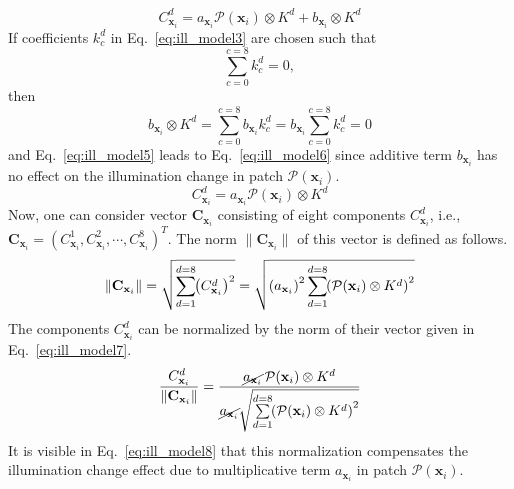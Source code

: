\documentclass[a4paper,fleqn]{cas-dc}
\begin{document}
%
\begin{equation} \label{eq:ill_model5}
C_{\mathbf{x}_i}^d = a_{\mathbf{x}_i}\mathcal{P}({\mathbf{x}_i}) \otimes K^d + b_{\mathbf{x}_i} \otimes K^d
\end{equation}
%
If coefficients $k_c^d$ in Eq.~\eqref{eq:ill_model3} are chosen such that 
\begin{equation} 
\sum_{c=0}^{c=8} k_{c}^d = 0,  \nonumber
\end{equation}
%
then 
%
\begin{equation} 
b_{\mathbf{x}_i} \otimes K^d =  \sum_{c=0}^{c=8} b_{\mathbf{x}_i}k_{c}^d = 
b_{\mathbf{x}_i} \sum_{c=0}^{c=8} k_{c}^d = 0
\nonumber 
\end{equation}
%
and Eq.~\eqref{eq:ill_model5} leads to Eq.~\eqref{eq:ill_model6} since additive term $b_{\mathbf{x}_i}$ has no effect on the illumination change in patch $\mathcal{P}({\mathbf{x}_i})$.  
%
\begin{equation} \label{eq:ill_model6}
C_{\mathbf{x}_i}^d = a_{\mathbf{x}_i}\mathcal{P}({\mathbf{x}_i}) \otimes K^d 
\end{equation}
Now, one can consider vector $\mathbf{C}_{\mathbf{x}_i}$ consisting of eight components $C_{\mathbf{x}_i}^d$, i.e., $\mathbf{C}_{\mathbf{x}_i} = \left(C_{\mathbf{x}_i}^1, C_{\mathbf{x}_i}^2, \cdots, C_{\mathbf{x}_i}^8\right)^T$. The norm $\|\mathbf{C}_{\mathbf{x}_i}\|$ of this vector is defined as follows.
%
\begin{equation} \label{eq:ill_model7}
\|\mathbf{C}_{\mathbf{x}_i}\| = \sqrt{\sum_{d=1}^{d=8}\hspace*{-1mm}\left(C_{\mathbf{x}_i}^d\right)^2} = \sqrt{\left(a_{\mathbf{x}_i}\right)^2\sum_{d=1}^{d=8} \hspace*{-1mm} \left(\mathcal{P}({\mathbf{x}_i}) \otimes K^d \right)^2}
\end{equation}
%
The components $C_{\mathbf{x}_i}^d$ can be normalized by the norm of their vector given in Eq.~\eqref{eq:ill_model7}.  
%
\begin{equation} \label{eq:ill_model8}
\frac{C_{\mathbf{x}_i}^d}{\|\mathbf{C}_{\mathbf{x}_i}\|} = 
\frac{\cancel{a_{\mathbf{x}_i}}\,\mathcal{P}({\mathbf{x}_i}) \otimes K^d}
{\cancel{a_{\mathbf{x}_i}}\sqrt{\sum\limits_{d=1}^{d=8} \hspace*{-1mm} \left(\mathcal{P}({\mathbf{x}_i}) \otimes K^d \right)^2}} 
\end{equation}
%
It is visible in Eq.~\eqref{eq:ill_model8} that this normalization 
compensates the illumination change effect due to multiplicative term $a_{\mathbf{x}_i}$ in patch $\mathcal{P}({\mathbf{x}_i})$.  
\end{document}
